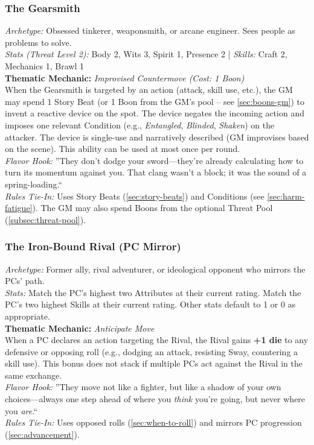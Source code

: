\subsubsection{The Gearsmith}
\textit{Archetype:} Obsessed tinkerer, weaponsmith, or arcane engineer. Sees people as problems to solve.\\
\textit{Stats (Threat Level 2):} Body 2, Wits 3, Spirit 1, Presence 2 \quad | \quad \textit{Skills:} Craft 2, Mechanics 1, Brawl 1\\
\textbf{Thematic Mechanic:} \textit{Improvised Countermove (Cost: 1 Boon)} \\
When the Gearsmith is targeted by an action (attack, skill use, etc.), the GM may spend 1 Story Beat (or 1 Boon from the GM's pool -- see \autoref{sec:boons-gm}) to invent a reactive device on the spot. The device negates the incoming action and imposes one relevant Condition (e.g., \textit{Entangled}, \textit{Blinded}, \textit{Shaken}) on the attacker. The device is single-use and narratively described (GM improvises based on the scene). This ability can be used at most once per round.\\
\textit{Flavor Hook:} ''They don't dodge your sword---they're already calculating how to turn its momentum against you. That clang wasn't a block; it was the sound of a spring-loading.``\\
\textit{Rules Tie-In:} Uses Story Beats (\autoref{sec:story-beats}) and Conditions (see \autoref{sec:harm-fatigue}). The GM may also spend Boons from the optional Threat Pool (\autoref{subsec:threat-pool}).

\subsubsection{The Iron-Bound Rival (PC Mirror)}
\textit{Archetype:} Former ally, rival adventurer, or ideological opponent who mirrors the PCs' path.\\
\textit{Stats:} Match the PC's highest two Attributes at their current rating. Match the PC's two highest Skills at their current rating. Other stats default to 1 or 0 as appropriate.\\
\textbf{Thematic Mechanic:} \textit{Anticipate Move} \\
When a PC declares an action targeting the Rival, the Rival gains \textbf{+1 die} to any defensive or opposing roll (e.g., dodging an attack, resisting Sway, countering a skill use). This bonus does not stack if multiple PCs act against the Rival in the same exchange.\\
\textit{Flavor Hook:} ''They move not like a fighter, but like a shadow of your own choices---always one step ahead of where you \textit{think} you're going, but never where you \textit{are}.``\\
\textit{Rules Tie-In:} Uses opposed rolls (\autoref{sec:when-to-roll}) and mirrors PC progression (\autoref{sec:advancement}).

